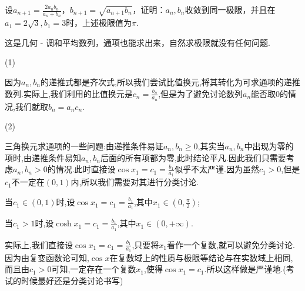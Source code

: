 \documentclass[../../main.tex]{subfiles}%
\begin{document}
\begin{example}\label{example-4.54112}
设\(a_{n + 1}=\frac{2a_nb_n}{a_n + b_n}\)，\(b_{n + 1}=\sqrt{a_{n + 1}b_n}\)，证明：\(a_n,b_n\)收敛到同一极限，并且在\(a_1 = 2\sqrt{3},b_1 = 3\)时，上述极限值为\(\pi\).
\end{example}
\begin{remark}
这是几何 - 调和平均数列，通项也能求出来，自然求极限就没有任何问题.
\end{remark}
\begin{note}
\hypertarget{比值换元的问题}{(1)}因为$a_n,b_n$的递推式都是齐次式,所以我们尝试比值换元,将其转化为可求通项的递推数列.实际上,我们利用的比值换元是$c_n=\frac{b_n}{a_n}$,但是为了避免讨论数列$a_n$能否取0的情况,我们就取$b_n=a_nc_n$.

\hypertarget{三角换元的问题}{(2)}三角换元求通项的一些问题:由递推条件易证$a_n,b_n\geqslant  0$,其实当$a_n,b_n$中出现为零的项时,由递推条件易知$a_n,b_n$后面的所有项都为零,此时结论平凡.因此我们只需要考虑$a_n,b_n>0$的情况.此时直接设\(\cos x_1 = c_1=\frac{b_1}{a_1}\)似乎不太严谨.因为虽然$c_1>0$,但是$c_1$不一定在$(0,1)$内,所以我们需要对其进行分类讨论.

当$c_1\in (0,1)$时,设\(\cos x_1 = c_1=\frac{b_1}{a_1}\),其中$x_1\in (0,\frac{\pi}{2})$;

当$c_1>1$时,设\(\cosh x_1 = c_1=\frac{b_1}{a_1}\),其中$x_1\in (0,+\infty)$.

实际上,我们直接设\(\cos x_1 = c_1=\frac{b_1}{a_1}\),只要将$x_1$看作一个复数,就可以避免分类讨论.因为由复变函数论可知,$\cos x$在复数域上的性质与极限等结论与在实数域上相同,而且由$c_1>0$可知,一定存在一个复数$x_1$,使得$\cos x_1=c_1$.所以这样做是严谨地.(考试的时候最好还是分类讨论书写)
\end{note}
\end{document}
